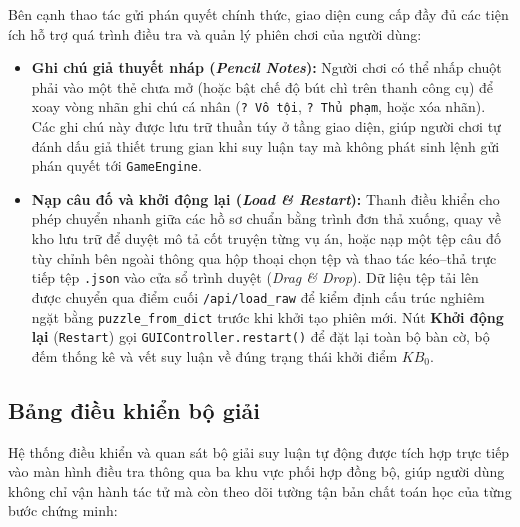 Bên cạnh thao tác gửi phán quyết chính thức, giao diện cung cấp đầy đủ các tiện ích hỗ trợ quá trình điều tra và quản lý phiên chơi của người dùng:
\begin{itemize}
    \item \textbf{Ghi chú giả thuyết nháp (\emph{Pencil Notes}):} Người chơi có thể nhấp chuột phải vào một thẻ chưa mở (hoặc bật chế độ bút chì trên thanh công cụ) để xoay vòng nhãn ghi chú cá nhân (\texttt{? Vô tội}, \texttt{? Thủ phạm}, hoặc xóa nhãn). Các ghi chú này được lưu trữ thuần túy ở tầng giao diện, giúp người chơi tự đánh dấu giả thiết trung gian khi suy luận tay mà không phát sinh lệnh gửi phán quyết tới \texttt{GameEngine}.
    \item \textbf{Nạp câu đố và khởi động lại (\emph{Load \& Restart}):} Thanh điều khiển cho phép chuyển nhanh giữa các hồ sơ chuẩn bằng trình đơn thả xuống, quay về kho lưu trữ để duyệt mô tả cốt truyện từng vụ án, hoặc nạp một tệp câu đố tùy chỉnh bên ngoài thông qua hộp thoại chọn tệp và thao tác kéo--thả trực tiếp tệp \texttt{.json} vào cửa sổ trình duyệt (\emph{Drag \& Drop}). Dữ liệu tệp tải lên được chuyển qua điểm cuối \texttt{/api/load\_raw} để kiểm định cấu trúc nghiêm ngặt bằng \texttt{puzzle\_from\_dict} trước khi khởi tạo phiên mới. Nút \textbf{Khởi động lại} (\texttt{Restart}) gọi \texttt{GUIController.restart()} để đặt lại toàn bộ bàn cờ, bộ đếm thống kê và vết suy luận về đúng trạng thái khởi điểm $KB_0$.
\end{itemize}

\subsection{Bảng điều khiển bộ giải}
\label{subsec:bang-dieu-khien-bo-giai}

Hệ thống điều khiển và quan sát bộ giải suy luận tự động được tích hợp trực tiếp vào màn hình điều tra thông qua ba khu vực phối hợp đồng bộ, giúp người dùng không chỉ vận hành tác tử mà còn theo dõi tường tận bản chất toán học của từng bước chứng minh:

